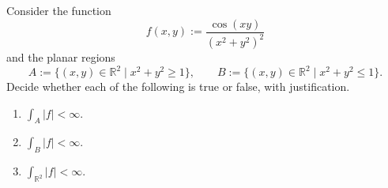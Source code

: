 \begin{exercise}
\label{ex:improper_cos_over_r4}
Consider the function
\[f(x,y) := \frac{\cos(xy)}{(x^2+y^2)^2}\]
and the planar regions
\[A := \{(x,y) \in \mathbb{R}^2 \mid x^2+y^2 \geq 1\}, \qquad
  B := \{(x,y) \in \mathbb{R}^2 \mid x^2+y^2 \leq 1\}.\]
Decide whether each of the following is true or false, with justification.
\begin{enumerate}[label=\textbf{(\alph*)}]
  \item $\int_A \lvert f\rvert < \infty$.
  \item $\int_B \lvert f\rvert < \infty$.
  \item $\int_{\mathbb{R}^2} \lvert f\rvert < \infty$.
\end{enumerate}
\end{exercise}
